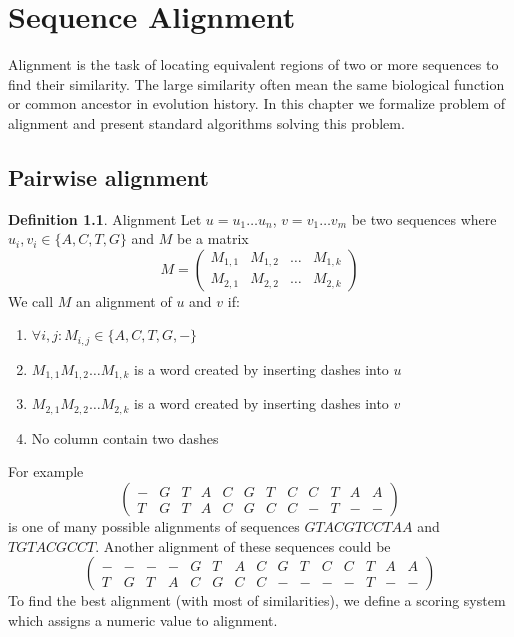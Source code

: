 \chapter{Sequence Alignment}

\label{kap:alignment} %

Alignment is the task of locating equivalent regions of two or more sequences to find their similarity.
The large similarity often mean the same biological function or common ancestor in evolution history.
In this chapter we formalize problem of alignment and present standard algorithms
solving this problem.

\section{Pairwise alignment}

\theoremstyle{definition}
\newtheorem{definition}{Definition}[section]
\theoremstyle{definition}
\begin{definition}{Alignment}
Let $u=u_1 \dots u_n$, $v=v_1 \dots v_m$ be two sequences where $u_i,v_i\in \{A, C, T, G\}$ and $M$ be a matrix
$$M=
\begin{pmatrix}
  M_{1,1} & M_{1,2} & \dots & M_{1,k} \\
  M_{2,1} & M_{2,2} & \dots & M_{2,k}
\end{pmatrix}$$
We call $M$ an alignment of $u$ and $v$ if:
\begin{enumerate}
\item $\forall i,j : M_{i,j}\in \{A,C,T,G,-\}$
\item $M_{1,1} M_{1,2} \dots M_{1,k}$ is a word created by inserting dashes into $u$
\item $M_{2,1} M_{2,2} \dots M_{2,k}$ is a word created by inserting dashes into $v$
\item No column contain two dashes
\end{enumerate}
\end{definition}

For example 
\setlength{\arraycolsep}{1pt}
\setcounter{MaxMatrixCols}{20}
$$
\begin{pmatrix}
   - & G & T & A & C & G & T & C & C & T & A & A \\
   T & G & T & A & C & G & C & C & - & T & - & -
\end{pmatrix}$$
is one  of many possible alignments of sequences $GTACGTCCTAA$ and $TGTACGCCT$.
Another alignment of these sequences could be 
$$\begin{pmatrix}
   -&-&-&-&G&T&A&C&G&T&C&C&T&A&A \\
   T&G&T&A&C&G&C&C&-&-&-&-&T&-&-
\end{pmatrix}$$
To find the best alignment (with most of similarities), we define a scoring system which assigns a numeric value to alignment.


